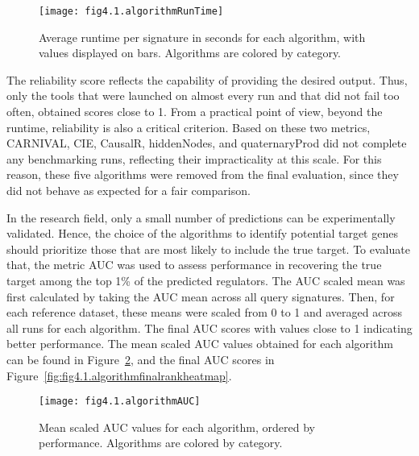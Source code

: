 \begin{figure}[htbp]
    \centering
    \texttt{[image: fig4.1.algorithmRunTime]}
    \caption[Runtime per signtures.]{Average runtime per signature in seconds for each algorithm, with values displayed on bars. Algorithms are colored by category.}
    \label{fig:fig4.1.algorithmRunTime}
\end{figure}

The reliability score reflects the capability of providing the desired output.
Thus, only the tools that were launched on almost every run and that did not fail too often, obtained scores close to 1.
From a practical point of view, beyond the runtime, reliability is also a critical criterion.
Based on these two metrics, \gls{CARNIVAL}, \gls{CIE}, CausalR, hiddenNodes, and quaternaryProd did not complete any benchmarking runs, reflecting their impracticality at this scale.
For this reason, these five algorithms were removed from the final evaluation, since they did not behave as expected for a fair comparison. 

In the research field, only a small number of predictions can be experimentally validated.
Hence, the choice of the algorithms to identify potential target genes should prioritize those that are most likely to include the true target.
To evaluate that, the metric \gls{AUC} was used to assess performance in recovering the true target among the top 1\% of the predicted regulators.
The \gls{AUC} scaled mean was first calculated by taking the \gls{AUC} mean across all query signatures. Then, for each reference dataset, these means were scaled from 0 to 1 and averaged across all runs for each algorithm.
The final \gls{AUC} scores with values close to 1 indicating better performance.
The mean scaled \gls{AUC} values obtained for each algorithm can be found in Figure~\ref{fig:fig4.1.algorithmAUC}, and the final \gls{AUC} scores in Figure~\ref{fig:fig4.1.algorithmfinalrankheatmap}. 

\begin{figure}[htbp]
    \centering
    \texttt{[image: fig4.1.algorithmAUC]}
    \caption[Mean scaled \gls{AUC} values for each algorithm.]{Mean scaled \gls{AUC} values for each algorithm, ordered by performance. Algorithms are colored by category.}
    \label{fig:fig4.1.algorithmAUC}
\end{figure}


